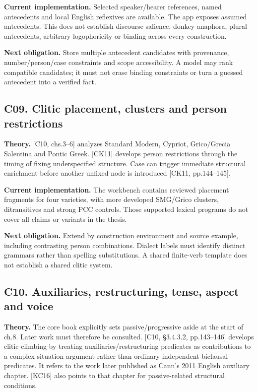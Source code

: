 \documentclass[11pt,a4paper]{article}
\begin{document}
\textbf{Current implementation.} Selected speaker/hearer references,
named antecedents and local English reflexives are available. The app
exposes assumed antecedents. This does not establish discourse salience,
donkey anaphora, plural antecedents, arbitrary logophoricity or binding
across every construction.

\textbf{Next obligation.} Store multiple antecedent candidates with
provenance, number/person/case constraints and scope accessibility. A
model may rank compatible candidates; it must not erase binding
constraints or turn a guessed antecedent into a verified fact.

\subsection{C09. Clitic placement, clusters and person
restrictions}\label{c09.-clitic-placement-clusters-and-person-restrictions}

\textbf{Theory.} {[}C10, chs.3--6{]} analyzes Standard Modern, Cypriot,
Grico/Grecia Salentina and Pontic Greek. {[}CK11{]} develops person
restrictions through the timing of fixing underspecified structure. Case
can trigger immediate structural enrichment before another unfixed node
is introduced {[}CK11, pp.144--145{]}.

\textbf{Current implementation.} The workbench contains reviewed
placement fragments for four varieties, with more developed SMG/Grico
clusters, ditransitives and strong PCC controls. Those supported lexical
programs do not cover all claims or variants in the thesis.

\textbf{Next obligation.} Extend by construction environment and source
example, including contrasting person combinations. Dialect labels must
identify distinct grammars rather than spelling substitutions. A shared
finite-verb template does not establish a shared clitic system.

\subsection{C10. Auxiliaries, restructuring, tense, aspect and
voice}\label{c10.-auxiliaries-restructuring-tense-aspect-and-voice}

\textbf{Theory.} The core book explicitly sets passive/progressive aside
at the start of ch.8. Later work must therefore be consulted. {[}C10,
§3.4.3.2, pp.143--146{]} develops clitic climbing by treating
auxiliaries/restructuring predicates as contributions to a complex
situation argument rather than ordinary independent biclausal
predicates. It refers to the work later published as Cann's 2011 English
auxiliary chapter. {[}KC16{]} also points to that chapter for
passive-related structural conditions.
\end{document}
